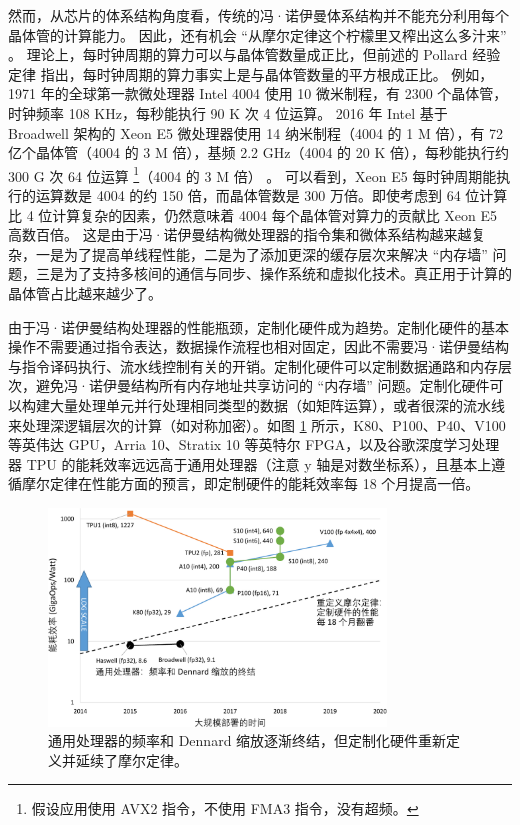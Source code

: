 然而，从芯片的体系结构角度看，传统的冯·诺伊曼体系结构并不能充分利用每个晶体管的计算能力。
因此，还有机会 ``从摩尔定律这个柠檬里又榨出这么多汁来'' \cite{threebody}。
理论上，每时钟周期的算力可以与晶体管数量成正比，但前述的 Pollard 经验定律 \cite{pollackpollack} 指出，每时钟周期的算力事实上是与晶体管数量的平方根成正比。
例如，1971 年的全球第一款微处理器 Intel 4004 使用 10 微米制程，有 2300 个晶体管，时钟频率 108 KHz，每秒能执行 90 K 次 4 位运算。
2016 年 Intel 基于 Broadwell 架构的 Xeon E5 微处理器使用 14 纳米制程（4004 的 1 M 倍），有 72 亿个晶体管（4004 的 3 M 倍），基频 2.2 GHz（4004 的 20 K 倍），每秒能执行约 300 G 次 64 位运算 \footnote{假设应用使用 AVX2 指令，不使用 FMA3 指令，没有超频。}（4004 的 3 M 倍） \cite{intel-e5-v4}。
可以看到，Xeon E5 每时钟周期能执行的运算数是 4004 的约 150 倍，而晶体管数是 300 万倍。即使考虑到 64 位计算比 4 位计算复杂的因素，仍然意味着 4004 每个晶体管对算力的贡献比 Xeon E5 高数百倍。
这是由于冯·诺伊曼结构微处理器的指令集和微体系结构越来越复杂，一是为了提高单线程性能，二是为了添加更深的缓存层次来解决 ``内存墙'' 问题，三是为了支持多核间的通信与同步、操作系统和虚拟化技术。真正用于计算的晶体管占比越来越少了。


由于冯·诺伊曼结构处理器的性能瓶颈，定制化硬件成为趋势。定制化硬件的基本操作不需要通过指令表达，数据操作流程也相对固定，因此不需要冯·诺伊曼结构与指令译码执行、流水线控制有关的开销。定制化硬件可以定制数据通路和内存层次，避免冯·诺伊曼结构所有内存地址共享访问的 ``内存墙'' 问题。定制化硬件可以构建大量处理单元并行处理相同类型的数据（如矩阵运算），或者很深的流水线来处理深逻辑层次的计算（如对称加密）。如图 \ref{background:fig:moores_law_redefined} 所示，K80、P100、P40、V100 等英伟达 GPU，Arria 10、Stratix 10 等英特尔 FPGA，以及谷歌深度学习处理器 TPU 的能耗效率远远高于通用处理器（注意 y 轴是对数坐标系），且基本上遵循摩尔定律在性能方面的预言，即定制硬件的能耗效率每 18 个月提高一倍。

\begin{figure}[htbp]
	\centering
	\includegraphics[width=0.8\textwidth]{figures/moores_law_redefined.pdf}
	\caption{通用处理器的频率和 Dennard 缩放逐渐终结，但定制化硬件重新定义并延续了摩尔定律。}
	\label{background:fig:moores_law_redefined}
\end{figure}

